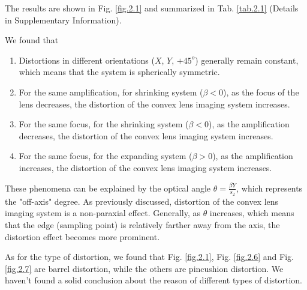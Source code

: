 \documentclass[10pt,a4paper,twocolumn,twoside,UTF8]{article}
\begin{document}
	The results are shown in Fig. \ref{fig.2.1} and summarized in Tab. \ref{tab.2.1} (Details in Supplementary Information).
	
	We found that
		\begin{enumerate}[label=\arabic*.]
			\item Distortions in different orientations ($X$, $Y$, $+45^o$) generally remain constant, which means that the system is spherically symmetric.
			\item For the same amplification, for shrinking system ($\beta<0$), as the focus of the lens decreases, the distortion of the convex lens imaging system increases.
			\item For the same focus, for the shrinking system ($\beta<0$), as the amplification decreases, the distortion of the convex lens imaging system increases.
			\item For the same focus, for the expanding system ($\beta>0$), as the amplification increases, the distortion of the convex lens imaging system increases.
		\end{enumerate}

	These phenomena can be explained by the optical angle $\theta = \frac{\beta Y}{s_2}$, which represents the "off-axis" degree. 
	As previously discussed, distortion of the convex lens imaging system is a non-paraxial effect.
	Generally, as $\theta$ increases, which means that the edge (sampling point) is relatively farther away from the axis, the distortion effect becomes more prominent.

	As for the type of distortion, we found that Fig. \ref{fig.2.1}, Fig. \ref{fig.2.6} and Fig. \ref{fig.2.7} are barrel distortion, while the others are pincushion distortion.
	We haven't found a solid conclusion about the reason of different types of distortion.
\end{document}
